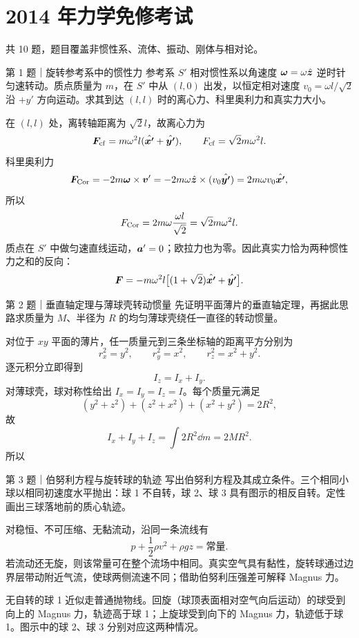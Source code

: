 \chapter{2014 年力学免修考试}
\noindent{}\quad{}\qquad 共 10 题，题目覆盖非惯性系、流体、振动、刚体与相对论。

\begin{problem}{第 1 题｜旋转参考系中的惯性力}
参考系 $S'$ 相对惯性系以角速度 $\bm{\omega}=\omega\hat{\bm{z}}$ 逆时针匀速转动。质点质量为 $m$，在 $S'$ 中从 $(l,0)$ 出发，以恒定相对速度 $v_0=\omega l/\sqrt2$ 沿 $+y'$ 方向运动。求其到达 $(l,l)$ 时的离心力、科里奥利力和真实力大小。
\FigRotFrame
\end{problem}
\begin{solution}
在 $(l,l)$ 处，离转轴距离为 $\sqrt2l$，故离心力为
\[
\bm{F}_{\rm cf}=m\omega^2l(\hat{\bm{x'}}+\hat{\bm{y'}}),
\qquad F_{\rm cf}=\sqrt2m\omega^2l.
\]
科里奥利力
\[
\bm{F}_{\rm Cor}=-2m\bm{\omega}\times\bm{v}'
=-2m\omega\hat{\bm{z}}\times(v_0\hat{\bm{y'}})
=2m\omega v_0\hat{\bm{x'}},
\]
所以
\[
F_{\rm Cor}=2m\omega\frac{\omega l}{\sqrt2}=\sqrt2m\omega^2l.
\]
质点在 $S'$ 中做匀速直线运动，$\bm{a}'=0$；欧拉力也为零。因此真实力恰为两种惯性力之和的反向：
\[
\bm{F}=-m\omega^2l\bigl[(1+\sqrt2)\hat{\bm{x'}}+\hat{\bm{y'}}\bigr].
\]
\end{solution}

\begin{problem}{第 2 题｜垂直轴定理与薄球壳转动惯量}
先证明平面薄片的垂直轴定理，再据此思路求质量为 $M$、半径为 $R$ 的均匀薄球壳绕任一直径的转动惯量。
\end{problem}
\begin{solution}
对位于 $xy$ 平面的薄片，任一质量元到三条坐标轴的距离平方分别为
\[
r_x^2=y^2,
\qquad r_y^2=x^2,
\qquad r_z^2=x^2+y^2.
\]
逐元积分立即得到
\[
\boxed{I_z=I_x+I_y}.
\]
对薄球壳，球对称性给出 $I_x=I_y=I_z=I$。每个质量元满足
\[
(y^2+z^2)+(z^2+x^2)+(x^2+y^2)=2R^2,
\]
故
\[
I_x+I_y+I_z=\int 2R^2\dd m=2MR^2.
\]
所以
\end{solution}

\begin{problem}{第 3 题｜伯努利方程与旋转球的轨迹}
写出伯努利方程及其成立条件。三个相同小球以相同初速度水平抛出：球 1 不自转，球 2、球 3 具有图示的相反自转。定性画出三球落地前的质心轨迹。
\FigMagnus
\end{problem}
\begin{solution}
对稳恒、不可压缩、无黏流动，沿同一条流线有
\[
\boxed{p+\frac12\rho v^2+\rho gz=\text{常量}}.
\]
若流动还无旋，则该常量可在整个流场中相同。真实空气具有黏性，旋转球通过边界层带动附近气流，使球两侧流速不同；借助伯努利压强差可解释 Magnus 力。

无自转的球 1 近似走普通抛物线。回旋（球顶表面相对空气向后运动）的球受到向上的 Magnus 力，轨迹高于球 1；上旋球受到向下的 Magnus 力，轨迹低于球 1。图示中的球 2、球 3 分别对应这两种情况。
\end{solution}

